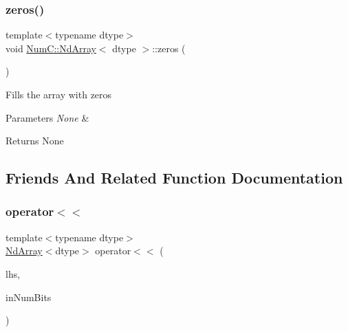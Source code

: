 \subsubsection{\texorpdfstring{zeros()}{zeros()}}
{\footnotesize\ttfamily template$<$typename dtype$>$ \\
void \mbox{\hyperlink{class_num_c_1_1_nd_array}{Num\+C\+::\+Nd\+Array}}$<$ dtype $>$\+::zeros (\begin{DoxyParamCaption}{ }\end{DoxyParamCaption})\hspace{0.3cm}{\ttfamily [inline]}}

Fills the array with zeros


\begin{DoxyParams}{Parameters}
{\em None} & \\
\hline
\end{DoxyParams}
\begin{DoxyReturn}{Returns}
None 
\end{DoxyReturn}


\subsection{Friends And Related Function Documentation}
\mbox{\label{class_num_c_1_1_nd_array_ad870c7e142d724ed1a984e4e0998d871}} 
\subsubsection{\texorpdfstring{operator$<$$<$}{operator<<}\hspace{0.1cm}{\footnotesize\ttfamily [1/2]}}
{\footnotesize\ttfamily template$<$typename dtype$>$ \\
\mbox{\hyperlink{class_num_c_1_1_nd_array}{Nd\+Array}}$<$dtype$>$ operator$<$$<$ (\begin{DoxyParamCaption}\item[{const \mbox{\hyperlink{class_num_c_1_1_nd_array}{Nd\+Array}}$<$ dtype $>$ \&}]{lhs,  }\item[{\mbox{\hyperlink{namespace_num_c_a60b2e2f49e1ff61059731c154e560869}{uint8}}}]{in\+Num\+Bits }\end{DoxyParamCaption})\hspace{0.3cm}{\ttfamily [friend]}}

